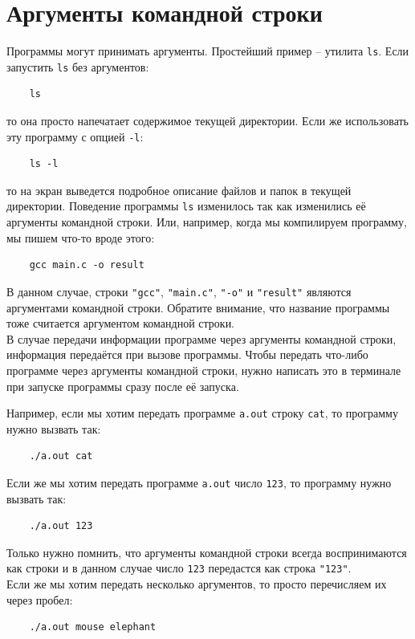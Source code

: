 \documentclass[10pt]{article}
\begin{document}
\section*{Аргументы командной строки}
Программы могут принимать аргументы. Простейший пример -- утилита \texttt{ls}. Если запустить \texttt{ls} без аргументов:
\begin{verbatim}
    ls
\end{verbatim}
то она просто напечатает содержимое текущей директории.  Если же использовать эту программу с опцией \texttt{-l}: 
\begin{verbatim}
    ls -l
\end{verbatim}
то на экран выведется подробное описание файлов и папок в текущей директории.
Поведение программы \texttt{ls} изменилось так как изменились её аргументы командной строки.
Или, например, когда мы компилируем программу, мы пишем что-то вроде этого:
\begin{verbatim}
    gcc main.c -o result
\end{verbatim}
В данном случае, строки \texttt{"gcc"}, \texttt{"main.c"}, \texttt{"\--o"} и \texttt{"result"} являются аргументами командной строки. Обратите внимание, что название программы тоже считается аргументом командной строки.\\

В случае передачи информации программе через аргументы командной строки, информация передаётся при вызове 
программы. Чтобы передать что-либо программе через аргументы командной строки, нужно
написать это в терминале при запуске программы сразу после её запуска.

Например, если мы хотим передать программе \texttt{a.out} строку \texttt{cat}, то программу нужно вызвать так:
\begin{verbatim}
    ./a.out cat
\end{verbatim}

Если же мы хотим передать программе \texttt{a.out} число \texttt{123}, то программу нужно вызвать так:
\begin{verbatim}
    ./a.out 123
\end{verbatim}
Только нужно помнить, что аргументы командной строки всегда воспринимаются как строки и в данном случае 
число \texttt{123} передастся как строка \texttt{"123"}. \\

Если же мы хотим передать несколько аргументов, то
просто перечисляем их через пробел:
\begin{verbatim}
    ./a.out mouse elephant
\end{verbatim}
\end{document}
